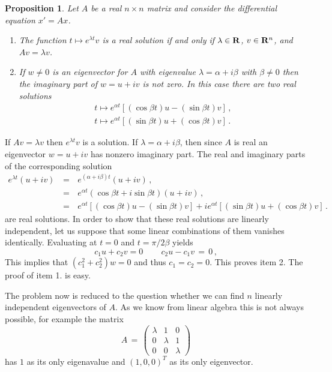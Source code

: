 \documentclass[12pt]{report}
\newcommand{\bR}{{\bf R}}
\newtheorem{prop}[theorem]{Proposition}
\newcommand{\proof}{\noindent {\em Proof:~}}
\newcommand{\nn}{\nonumber}
\def\qed{\hbox{\hskip 6pt\vrule width6pt height7pt depth1pt
    \hskip1pt}\bigskip}
\begin{document}
\begin{prop} Let $A$ be a real $n\times n$ matrix and consider the 
differential equation $x'=Ax$.
\begin{enumerate}
\item The function $t \mapsto e^{\lambda t}v$ is a real solution if
and only if $\lambda\in \bR$, $v \in \bR^n$, and $Av=\lambda v$.
\item If $w\not=0$ is an eigenvector for $A$ with eigenvalue $\lambda
= \alpha + i \beta$ with $\beta \not=0$ then the imaginary part of
$w=u+iv$ is not zero.  In this case there are two real solutions
\begin{eqnarray}
t \mapsto  e^{\alpha t} \left [ (\cos\beta t) u - (\sin \beta t) v \right] 
\,,  \\
t \mapsto  e^{\alpha t} \left[ (\sin\beta t) u + (\cos \beta t) v \right] \,. 
\end{eqnarray}
\end{enumerate}
\end{prop}

\proof If $Av=\lambda v$ then $e^{\lambda t}v$ is a solution.  If
$\lambda =\alpha + i \beta$, then since $A$ is real an eigenvector
$w=u+iv$ has nonzero imaginary part.  The real and imaginary parts of
the corresponding solution
\begin{eqnarray}
e^{\lambda t} (u +iv) \,&=&\, e^{ (\alpha + i \beta)t}(u +iv) \,, \nn \\
\,&=&\, e^{ \alpha t}  (\cos \beta t + i \sin \beta t) (u +iv) \,, \nn \\
\,&=&\, e^{\alpha t} \left [ (\cos\beta t) u - (\sin \beta t) v \right]  
+ i e^{\alpha t} \left[ (\sin\beta t) u + (\cos \beta t) v \right] \,.
\end{eqnarray}
are real solutions. In order to show that these real solutions are
linearly independent, let us suppose that some linear combinations of
them vanishes identically.  Evaluating at $t=0$ and $t =\pi/2\beta$
yields
\begin{equation}
c_1u + c_2 v=0 \,\quad \quad c_2 u - c_1 v \,=\,0\,,
\end{equation}
This implies that $(c_1^2 + c_2^2)w=0$ and thus $c_1=c_2=0$.  This
proves item 2.  The proof of item 1. is easy.  \hfill \qed


The problem now is reduced to the question whether we can find $n$
linearly independent eigenvectors of $A$. As we know from linear
algebra this is not always possible, for example the matrix 
\begin{equation}
A\,=\, \left(
\begin{array}{ccc} \lambda & 1 & 0 \\ 0 & \lambda & 1 \\ 0 & 0 & \lambda 
\end{array} 
\right) \label{frr}
\end{equation}
has $1$ as its only eigenavalue and $\left(1,0,0\right)^T$ as its only eigenvector. 
\end{document}
